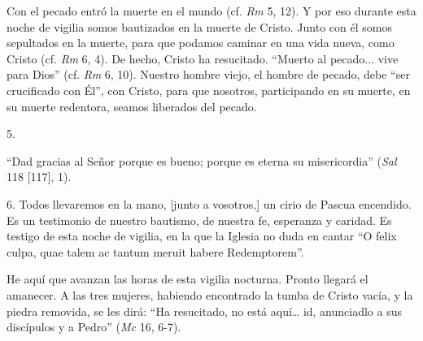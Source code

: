 			\begin{body}Con el pecado entró la muerte en el mundo (cf. \textit{Rm }5, 12). Y por eso durante esta noche de vigilia somos bautizados en la muerte de Cristo. Junto con él somos sepultados en la muerte, para que podamos caminar en una vida nueva, como Cristo (cf. \textit{Rm} 6, 4). De hecho, Cristo ha resucitado. “Muerto al pecado... vive para Dios” (cf. \textit{Rm }6, 10). Nuestro hombre viejo, el hombre de pecado, debe “ser crucificado con Él”, con Cristo, para que nosotros, participando en su muerte, en su muerte redentora, seamos liberados del pecado. \end{body}
			
			\begin{body}5. \begin{bodysmall} \end{bodysmall}\end{body}
			
			\begin{body}“Dad gracias al Señor porque es bueno; porque es eterna su misericordia” (\textit{Sal} 118 [117], 1). \end{body}
			
			\begin{body}6. Todos llevaremos en la mano, [junto a vosotros,] un cirio de Pascua encendido. Es un testimonio de nuestro bautismo, de nuestra fe, esperanza y caridad. Es testigo de esta noche de vigilia, en la que la Iglesia no duda en cantar “O felix culpa, quae talem ac tantum meruit habere Redemptorem”. \end{body}
			
			\begin{body}He aquí que avanzan las horas de esta vigilia nocturna. Pronto llegará el amanecer. A las tres mujeres, habiendo encontrado la tumba de Cristo vacía, y la piedra removida, se les dirá: “Ha resucitado, no está aquí… id, anunciadlo a sus discípulos y a Pedro” (\textit{Mc} 16, 6-7). \end{body}
			
